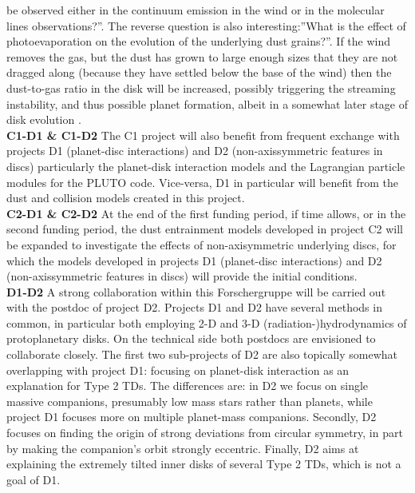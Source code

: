 \documentclass[10pt,fleqn,twoside]{article}
\begin{document}
be observed either in the continuum emission in the wind or in the
molecular lines observations?''. The reverse question is also
interesting:''What is the effect of photoevaporation on the evolution
of the underlying dust grains?''.  If the wind removes the gas, but the dust has
  grown to large enough sizes that they are not dragged along (because they
  have settled below the base of the wind) then the dust-to-gas ratio in the
  disk will be increased, possibly triggering the streaming instability, and
  thus possible planet formation, albeit in a somewhat later stage of disk
  evolution \citep[e.g.]{2005ApJ...623L.149T}.\\
{\bf C1-D1 \& C1-D2}
  The C1 project will also benefit from 
frequent exchange with projects D1 (planet-disc interactions) and D2
(non-axissymmetric features in discs)
particularly the planet-disk interaction models and the Lagrangian
particle modules for the PLUTO code. Vice-versa, D1 in particular will
benefit from the dust and collision models created in this
project. \\
{\bf C2-D1 \& C2-D2} At the end of the first funding period, if time allows, or
in the second funding period, the dust entrainment models developed in
project C2 will be expanded to investigate the effects of
non-axisymmetric underlying discs, for which the models developed in
projects D1 (planet-disc interactions) and D2 (non-axissymmetric
features in discs) will provide the initial conditions.  \\
{\bf D1-D2} A strong collaboration within this Forschergruppe will be carried
  out with the postdoc of project D2.  Projects D1 and D2 have several
  methods in common, in particular both employing 2-D and 3-D
  (radiation-)hydrodynamics of protoplanetary disks.  On the technical side
  both postdocs are envisioned to collaborate closely.  The first two
  sub-projects of D2 are also topically somewhat overlapping with project
  D1: focusing on planet-disk interaction as an explanation for Type 2 TDs.
  The differences are: in D2 we focus on single massive companions,
  presumably low mass stars rather than planets, while project D1 focuses
  more on multiple planet-mass companions. Secondly, D2 focuses on finding
  the origin of strong deviations from circular symmetry, in part by making
  the companion’s orbit strongly eccentric. Finally, D2 aims at explaining
  the extremely tilted inner disks of several Type 2 TDs, which is not a
  goal of D1.
\\
\end{document}
